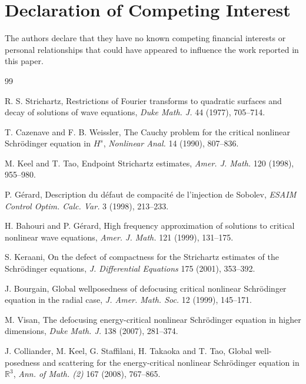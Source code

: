 \documentclass[preprint,12pt]{elsarticle}
\numberwithin{equation}{section}
\newcommand{\R}{\mathbb R}
\theoremstyle{remark}
\begin{document}
\section*{Declaration of Competing Interest}
The authors declare that they have no known competing financial interests or personal relationships that could have appeared to influence the work reported in this paper.
\begin{thebibliography}{99}

R. S. Strichartz,
\newblock Restrictions of Fourier transforms to quadratic surfaces and decay of solutions of wave equations,
\newblock \emph{Duke Math. J.} 44 (1977), 705--714.

T. Cazenave and F. B. Weissler,
\newblock The Cauchy problem for the critical nonlinear Schr\"odinger equation in $H^s$,
\newblock \emph{Nonlinear Anal.} 14 (1990), 807--836.

M. Keel and T. Tao,
\newblock Endpoint Strichartz estimates,
\newblock \emph{Amer. J. Math.} 120 (1998), 955--980.

P. G\'erard,
\newblock Description du d\'efaut de compacit\'e de l'injection de Sobolev,
\newblock \emph{ESAIM Control Optim. Calc. Var.} 3 (1998), 213--233.

H. Bahouri and P. G\'erard,
\newblock High frequency approximation of solutions to critical nonlinear wave equations,
\newblock \emph{Amer. J. Math.} 121 (1999), 131--175.

S. Keraani,
\newblock On the defect of compactness for the Strichartz estimates of the Schr\"odinger equations,
\newblock \emph{J. Differential Equations} 175 (2001), 353--392.

J. Bourgain,
\newblock Global wellposedness of defocusing critical nonlinear Schr\"odinger equation in the radial case,
\newblock \emph{J. Amer. Math. Soc.} 12 (1999), 145--171.

M. Visan,
\newblock The defocusing energy-critical nonlinear Schr\"odinger equation in higher dimensions,
\newblock \emph{Duke Math. J.} 138 (2007), 281--374.

J. Colliander, M. Keel, G. Staffilani, H. Takaoka and T. Tao,
\newblock Global well-posedness and scattering for the energy-critical nonlinear Schr\"odinger equation in $\R^3$,
\newblock \emph{Ann. of Math. (2)} 167 (2008), 767--865.


\end{thebibliography}
\end{document}
